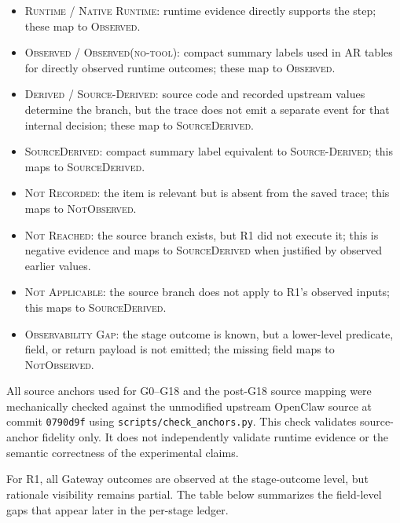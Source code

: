 \begin{itemize}
    \item \textsc{Runtime} / \textsc{Native Runtime}: runtime evidence
    directly supports the step; these map to \textsc{Observed}.
    \item \textsc{Observed} / \textsc{Observed(no-tool)}: compact summary
    labels used in AR tables for directly observed runtime outcomes; these
    map to \textsc{Observed}.
    \item \textsc{Derived} / \textsc{Source-Derived}: source code and
    recorded upstream values determine the branch, but the trace does not
    emit a separate event for that internal decision; these map to
    \textsc{SourceDerived}.
    \item \textsc{SourceDerived}: compact summary label equivalent to
    \textsc{Source-Derived}; this maps to \textsc{SourceDerived}.
    \item \textsc{Not Recorded}: the item is relevant but is absent from
    the saved trace; this maps to \textsc{NotObserved}.
    \item \textsc{Not Reached}: the source branch exists, but R1 did not
    execute it; this is negative evidence and maps to
    \textsc{SourceDerived} when justified by observed earlier values.
    \item \textsc{Not Applicable}: the source branch does not apply to
    R1's observed inputs; this maps to \textsc{SourceDerived}.
    \item \textsc{Observability Gap}: the stage outcome is known, but a
    lower-level predicate, field, or return payload is not emitted; the
    missing field maps to \textsc{NotObserved}.
\end{itemize}

All source anchors used for G0--G18 and the post-G18 source mapping
were mechanically checked against the unmodified upstream OpenClaw
source at commit \texttt{0790d9f} using \texttt{scripts/check\_anchors.py}.
This check validates source-anchor fidelity only. It does not
independently validate runtime evidence or the semantic correctness of
the experimental claims.

For R1, all Gateway outcomes are observed at the stage-outcome level, but
rationale visibility remains partial. The table below summarizes the
field-level gaps that appear later in the per-stage ledger.

